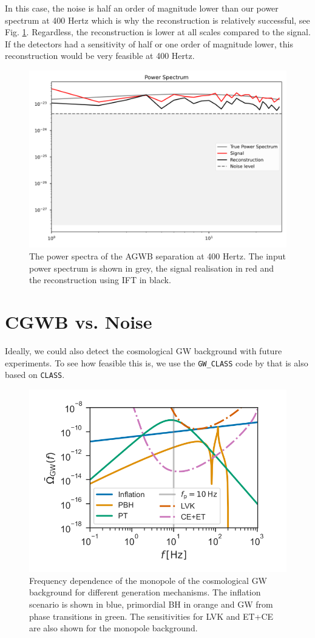 In this case, the noise is half an order of magnitude lower than our power spectrum at 400 Hertz which is why the reconstruction is relatively successful, see Fig. \ref{400Hz_power_spectrum}. Regardless, the reconstruction is lower at all scales compared to the signal. If the detectors had a sensitivity of half or one order of magnitude lower, this reconstruction would be very feasible at 400 Hertz.

\begin{figure}[h]
    \centering
    \includegraphics[width=0.8\linewidth]{Images/power_spectrum_400Hz_2D.png}
    \caption[The power spectra of the AGWB separation at 400 Hertz.]{The power spectra of the AGWB separation at 400 Hertz. The input power spectrum is shown in grey, the signal realisation in red and the reconstruction using IFT in black.}
    \label{400Hz_power_spectrum}
\end{figure} 

\section{CGWB vs. Noise}

Ideally, we could also detect the cosmological GW background with future experiments. To see how feasible this is, we use the {\tt GW\_CLASS} code by \cite{schulze_gw_class_2023} that is also based on {\tt CLASS}. 
\begin{figure}[h]
    \centering
    \includegraphics[width=0.6\linewidth]{Images/schulze_monopole.png}
    \caption[Frequency dependence of the monopole of the cosmological GW background for different generation mechanisms.]{Frequency dependence of the monopole of the cosmological GW background for different generation mechanisms. The inflation scenario is shown in blue, primordial BH in orange and GW from phase transitions in green. The sensitivities for LVK and ET+CE are also shown for the monopole background.}
    \label{cosmo_monopole}
\end{figure} 

